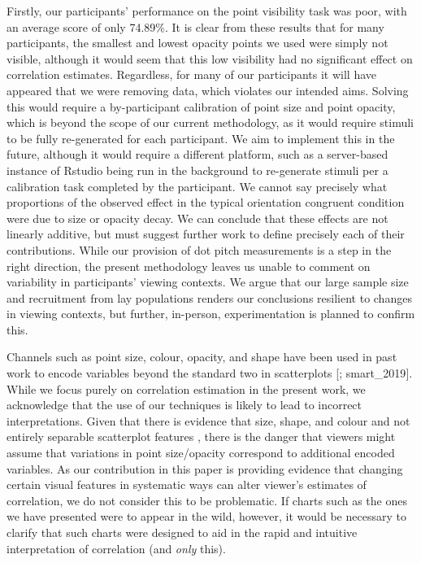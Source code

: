 \documentclass[manuscript, review, anonymous, screen]{acmart}
\begin{document}
Firstly, our participants' performance on the point visibility task was
poor, with an average score of only 74.89\%. It is clear from these
results that for many participants, the smallest and lowest opacity
points we used were simply not visible, although it would seem that this
low visibility had no significant effect on correlation estimates.
Regardless, for many of our participants it will have appeared that we
were removing data, which violates our intended aims. Solving this would
require a by-participant calibration of point size and point opacity,
which is beyond the scope of our current methodology, as it would
require stimuli to be fully re-generated for each participant. We aim to
implement this in the future, although it would require a different
platform, such as a server-based instance of Rstudio being run in the
background to re-generate stimuli per a calibration task completed by
the participant. We cannot say precisely what proportions of the
observed effect in the typical orientation congruent condition were due
to size or opacity decay. We can conclude that these effects are not
linearly additive, but must suggest further work to define precisely
each of their contributions. While our provision of dot pitch
measurements is a step in the right direction, the present methodology
leaves us unable to comment on variability in participants' viewing
contexts. We argue that our large sample size and recruitment from lay
populations renders our conclusions resilient to changes in viewing
contexts, but further, in-person, experimentation is planned to confirm
this.

Channels such as point size, colour, opacity, and shape have been used
in past work to encode variables beyond the standard two in scatterplots
{[}\citet{hong_2021}; smart\_2019{]}. While we focus purely on
correlation estimation in the present work, we acknowledge that the use
of our techniques is likely to lead to incorrect interpretations. Given
that there is evidence that size, shape, and colour and not entirely
separable scatterplot features \citep{smart_2019}, there is the danger
that viewers might assume that variations in point size/opacity
correspond to additional encoded variables. As our contribution in this
paper is providing evidence that changing certain visual features in
systematic ways can alter viewer's estimates of correlation, we do not
consider this to be problematic. If charts such as the ones we have
presented were to appear in the wild, however, it would be necessary to
clarify that such charts were designed to aid in the rapid and intuitive
interpretation of correlation (and \emph{only} this).
\end{document}
